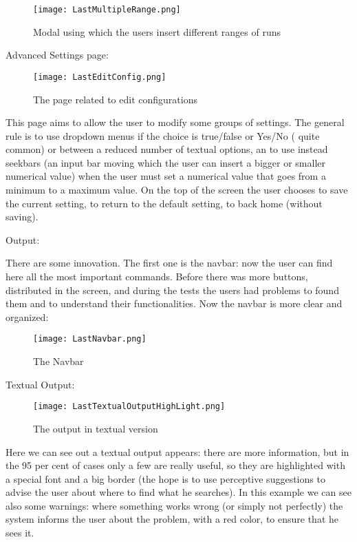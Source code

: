 \begin{figure}[H]
\centering
\texttt{[image: LastMultipleRange.png]} 
\caption{Modal using which the users insert different ranges of runs }
\end{figure}   

Advanced Settings page:

\begin{figure}[H]
\centering
\texttt{[image: LastEditConfig.png]} 
\caption{The page related to edit configurations}
\end{figure}   

This page aims to allow the user to modify some groups of settings. The general rule is to use dropdown menus if the choice is true/false or Yes/No (	quite common) or between a reduced number of textual options, an to use instead  seekbars (an input bar moving which the user can insert a bigger or smaller numerical value) when the user must set a numerical value that goes from a minimum to a maximum value. On the top of the screen the user chooses to save the current setting, to return to the default setting, to back home (without saving).    


Output: 

There are some innovation. The first one is the navbar: now the user can find here all the most important commands. Before there was more buttons, distributed in the screen, and during the tests the users had problems to found them and to understand their functionalities. Now the navbar is more clear and organized:

\begin{figure}[H]
\centering
\texttt{[image: LastNavbar.png]} 
\caption{The Navbar}
\end{figure}  


Textual Output:

\begin{figure}[H]
\centering
\texttt{[image: LastTextualOutputHighLight.png]} 
\caption{The output in textual version}
\end{figure}  

Here we can see out a textual output appears: there are more information, but in the 95 per cent of cases only a few are really useful, so they are highlighted with a special font and a big border (the hope is to use perceptive suggestions to advise the user about where to find what he searches). In this example we can see also some warnings: where something works wrong (or simply not perfectly) the system informs the user about the problem, with a red color, to ensure that he sees it. 

